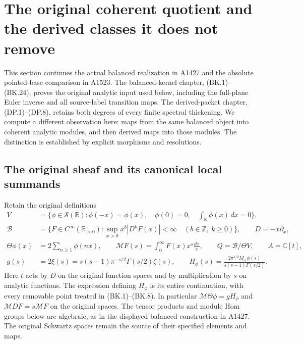 \section{The original coherent quotient and the derived classes it does not remove}
\label{sec:original-coherent-comparison}

This section continues the actual balanced realization in A1427 and the
absolute pointed-base comparison in A1523.  The balanced-kernel chapter,
(BK.1)--(BK.24), proves the original analytic input used below, including
the full-plane Euler inverse and all source-label transition maps.
The derived-packet chapter, (DP.1)--(DP.8), retains both degrees of every
finite spectral thickening.  We compute a different observation here:
maps from the same balanced object into coherent analytic modules, and
then derived maps into those modules.  The distinction is established by
explicit morphisms and resolutions.

\subsection{The original sheaf and its canonical local summands}

Retain the original definitions
\[
\begin{split}
 V&=\{\phi\in\mathcal S(\mathbb R):\phi(-x)=\phi(x),\quad
       \phi(0)=0,\quad\textstyle\int_{\mathbb R}\phi(x)\,dx=0\},\\
 \mathscr B&=\{F\in C^\infty(\mathbb R_{>0}):
   \sup_{x>0}x^b|D^kF(x)|<\infty\quad(b\in\mathbb Z,\ k\ge0)\},
       \qquad D=-x\partial_x,\\
 \Theta\phi(x)&=2\sum_{n\ge1}\phi(nx),\qquad
 \mathcal MF(s)=\int_0^\infty F(x)x^s\frac{dx}{x},\qquad
 Q=\mathscr B/\Theta V,\qquad A=\mathbb C[t],\\
 g(s)&=2\xi(s)=s(s-1)\pi^{-s/2}\Gamma(s/2)\zeta(s),\qquad
 H_\phi(s)=\frac{2\pi^{s/2}M_+\phi(s)}{s(s-1)\Gamma(s/2)}.
\end{split}                                                     \tag{OCQ.1}
\]
Here $t$ acts by $D$ on the original function spaces and by multiplication
by $s$ on analytic functions.  The expression defining $H_\phi$ is its
entire continuation, with every removable point treated in (BK.1)--(BK.8).
In particular $\mathcal M\Theta\phi=gH_\phi$ and
$\mathcal M DF=s\mathcal MF$ on the original spaces.
The tensor products and module Hom groups below are algebraic, as in
the displayed balanced construction in A1427.  The original Schwartz
spaces remain the source of their specified elements and maps.


